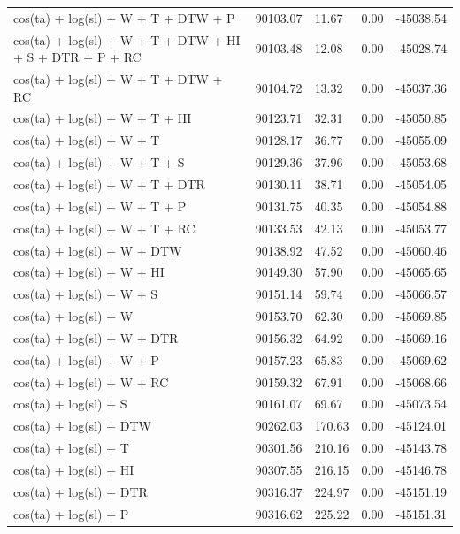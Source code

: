 \documentclass[abstract=off,10pt,a4paper,bibliography=totocnumbered]{article}
\begin{document}
\begin{table}[hbpt]
\begin{center}
{\begin{threeparttable}
\begin{tabular}{lllll}
          cos(ta) + log(sl) + W + T + DTW + P & 90103.07 & 11.67 & 0.00 & -45038.54 \\
          cos(ta) + log(sl) + W + T + DTW + HI + S + DTR + P + RC & 90103.48 & 12.08 & 0.00 & -45028.74 \\
          cos(ta) + log(sl) + W + T + DTW + RC & 90104.72 & 13.32 & 0.00 & -45037.36 \\
          cos(ta) + log(sl) + W + T + HI & 90123.71 & 32.31 & 0.00 & -45050.85 \\
          cos(ta) + log(sl) + W + T & 90128.17 & 36.77 & 0.00 & -45055.09 \\
          cos(ta) + log(sl) + W + T + S & 90129.36 & 37.96 & 0.00 & -45053.68 \\
          cos(ta) + log(sl) + W + T + DTR & 90130.11 & 38.71 & 0.00 & -45054.05 \\
          cos(ta) + log(sl) + W + T + P & 90131.75 & 40.35 & 0.00 & -45054.88 \\
          cos(ta) + log(sl) + W + T + RC & 90133.53 & 42.13 & 0.00 & -45053.77 \\
          cos(ta) + log(sl) + W + DTW & 90138.92 & 47.52 & 0.00 & -45060.46 \\
          cos(ta) + log(sl) + W + HI & 90149.30 & 57.90 & 0.00 & -45065.65 \\
          cos(ta) + log(sl) + W + S & 90151.14 & 59.74 & 0.00 & -45066.57 \\
          cos(ta) + log(sl) + W & 90153.70 & 62.30 & 0.00 & -45069.85 \\
          cos(ta) + log(sl) + W + DTR & 90156.32 & 64.92 & 0.00 & -45069.16 \\
          cos(ta) + log(sl) + W + P & 90157.23 & 65.83 & 0.00 & -45069.62 \\
          cos(ta) + log(sl) + W + RC & 90159.32 & 67.91 & 0.00 & -45068.66 \\
          cos(ta) + log(sl) + S & 90161.07 & 69.67 & 0.00 & -45073.54 \\
          cos(ta) + log(sl) + DTW & 90262.03 & 170.63 & 0.00 & -45124.01 \\
          cos(ta) + log(sl) + T & 90301.56 & 210.16 & 0.00 & -45143.78 \\
          cos(ta) + log(sl) + HI & 90307.55 & 216.15 & 0.00 & -45146.78 \\
          cos(ta) + log(sl) + DTR & 90316.37 & 224.97 & 0.00 & -45151.19 \\
          cos(ta) + log(sl) + P & 90316.62 & 225.22 & 0.00 & -45151.31 \\

\end{tabular}
\end{threeparttable}}
\end{center}
\end{table}
\end{document}
